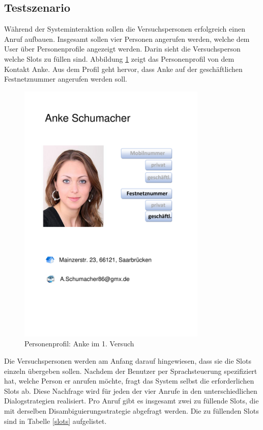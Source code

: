 \documentclass[12pt,a4paper]{scrartcl}
\begin{document}
\subsection{Testszenario}
\label{testszenario1}
Während der Systeminteraktion sollen die Versuchspersonen erfolgreich einen Anruf aufbauen. Insgesamt sollen vier Personen angerufen werden, welche dem User über Personenprofile angezeigt werden.  Darin sieht die Versuchsperson welche Slots zu füllen sind. Abbildung \ref{anke} zeigt das Personenprofil von dem Kontakt Anke. Aus dem Profil geht hervor, dass Anke auf der geschäftlichen Festnetznummer angerufen werden soll. 
\begin{figure}[H]
\begin{center}
\includegraphics[width=9cm]{Anke.pdf}
\caption{Personenprofil: Anke im 1. Versuch}
\label{anke}
\end{center}
\end{figure}
Die Versuchspersonen werden am Anfang darauf hingewiesen, dass sie die Slots einzeln übergeben sollen. Nachdem der Benutzer per Sprachsteuerung spezifiziert hat, welche Person er anrufen möchte, fragt das System selbst die erforderlichen Slots ab. Diese Nachfrage wird für jeden der vier Anrufe in den unterschiedlichen Dialogstrategien realisiert. Pro Anruf gibt es insgesamt zwei zu füllende Slots, die mit derselben Disambiguierungsstrategie abgefragt werden. Die zu füllenden Slots sind in Tabelle \ref{slots} aufgelistet.
\end{document}
